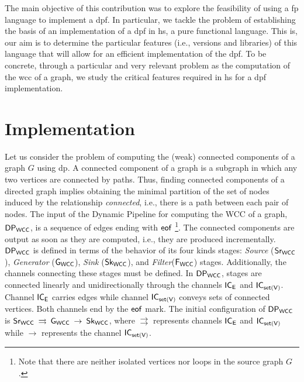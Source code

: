 The main objective of this contribution was to explore the feasibility of using a  \acrfull{fp} language to implement a \acrshort{dpf}. In particular, 
we tackle the problem of establishing the basis of an implementation of a \acrshort{dpf}  in \acrshort{hs}, a pure functional language. This is,  our aim is to determine the particular features (i.e., versions and libraries) 
of this language that will allow for an efficient implementation of the \acrshort{dpf}. To be concrete, through a particular and very relevant problem as the computation of the \acrfull{wcc} of a graph,  we study the 
critical features required  in \acrshort{hs} for a \acrshort{dpf} implementation.

\section{Implementation}
Let us consider the problem of computing the (weak) connected components of a graph $G$ using \acrshort{dp}. A connected component of a graph is a subgraph in which any two vertices are connected by paths. Thus, finding connected components of a directed graph implies obtaining the minimal partition of the set of nodes induced by the relationship \textit{connected}, i.e., there is a path between each pair of nodes. The input of the Dynamic Pipeline for computing the WCC of a graph, $\mathsf{DP_{WCC}}$, is a sequence of edges ending with $\mathsf{eof}$%
\footnote{Note that there are neither isolated vertices nor loops in the source graph $G$.}. The connected components are output as soon as they are computed, i.e., they are produced incrementally. 
%
$\mathsf{DP_{WCC}}$ is defined in terms of the behavior of its four kinds stages: \textit{Source} ($\mathsf{Sr_{WCC}}$),  \textit{Generator} ($\mathsf{G_{WCC}}$),  \textit{Sink} ($\mathsf{Sk_{WCC}}$), and \textit{Filter}($\mathsf{F_{WCC}}$) stages. Additionally,  the channels connecting these stages must be defined. In $\mathsf{DP_{WCC}}$, stages are connected linearly and unidirectionally through the channels $\mathsf{IC_E}$ and  $\mathsf{IC_{set(V)}}$. Channel $\mathsf{IC_E}$ carries edges while channel  $\mathsf{IC_{set(V)}}$ conveys sets of connected vertices. Both channels end by the $\mathsf{eof}$ mark. The initial configuration of $\mathsf{DP_{WCC}}$ is $\mathsf{Sr_{WCC}} \:\rightrightarrows\:\mathsf{G_{WCC}} \:\rightarrow \: \mathsf{Sk_{WCC}}$, where $\rightrightarrows$ represents  channels $\mathsf{IC_E}$ and $\mathsf{IC_{set(V)}}$ while $\rightarrow$ represents the channel $\mathsf{IC_{set(V)}}$.
 
